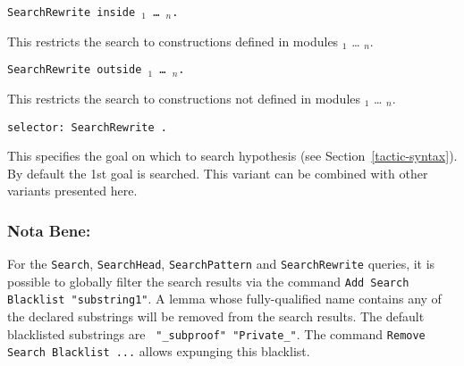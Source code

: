 \begin{Variants}
\item {\tt SearchRewrite {\term} inside
{\module$_1$} \ldots{} {\module$_n$}.}

This restricts the search to constructions defined in modules
{\module$_1$} \ldots{} {\module$_n$}.

\item {\tt SearchRewrite {\term} outside {\module$_1$} \ldots{} {\module$_n$}.}

This restricts the search to constructions not defined in modules
{\module$_1$} \ldots{} {\module$_n$}.

\item {\tt selector: SearchRewrite {\term}.}

  This specifies the goal on which to search hypothesis (see
  Section~\ref{tactic-syntax}). By default the 1st goal is searched.
  This variant can be combined with other variants presented here.

\end{Variants}

\subsubsection{Nota Bene:}
For the {\tt Search}, {\tt SearchHead}, {\tt SearchPattern} and
{\tt SearchRewrite} queries, it is possible to globally filter
the search results via the command
{\tt Add Search Blacklist "substring1"}.
A lemma whose fully-qualified name contains any of the declared substrings
will be removed from the search results.
The default blacklisted substrings are {\tt 
  "\_subproof" "Private\_"}. The command {\tt Remove Search Blacklist
  ...} allows expunging this blacklist.


